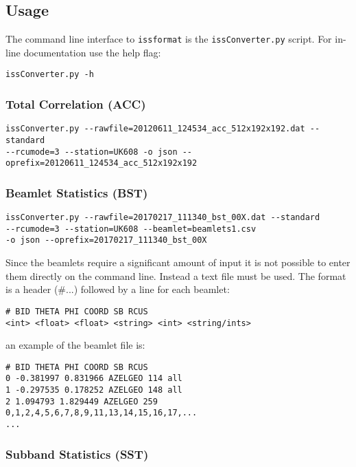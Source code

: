 \documentclass[10pt,a4paper]{article}
\begin{document}
\subsection{Usage}

The command line interface to \texttt{issformat} is the \texttt{issConverter.py}
script. For in-line documentation use the help flag:

\begin{verbatim}
issConverter.py -h
\end{verbatim}

\subsubsection{Total Correlation (ACC)}

\begin{verbatim}
issConverter.py --rawfile=20120611_124534_acc_512x192x192.dat --standard
--rcumode=3 --station=UK608 -o json --oprefix=20120611_124534_acc_512x192x192
\end{verbatim}

\subsubsection{Beamlet Statistics (BST)}

\begin{verbatim}
issConverter.py --rawfile=20170217_111340_bst_00X.dat --standard
--rcumode=3 --station=UK608 --beamlet=beamlets1.csv
-o json --oprefix=20170217_111340_bst_00X
\end{verbatim}

Since the beamlets require a significant amount of input it is not possible to
enter them directly on the command line. Instead a text file must be used. The
format is a header (\#...) followed by a line for each beamlet:

\begin{verbatim}
# BID THETA PHI COORD SB RCUS
<int> <float> <float> <string> <int> <string/ints>
\end{verbatim}

\noindent an example of the beamlet file is:

\begin{verbatim}
# BID THETA PHI COORD SB RCUS
0 -0.381997 0.831966 AZELGEO 114 all
1 -0.297535 0.178252 AZELGEO 148 all
2 1.094793 1.829449 AZELGEO 259 0,1,2,4,5,6,7,8,9,11,13,14,15,16,17,...
...
\end{verbatim}

\subsubsection{Subband Statistics (SST)}
\end{document}
